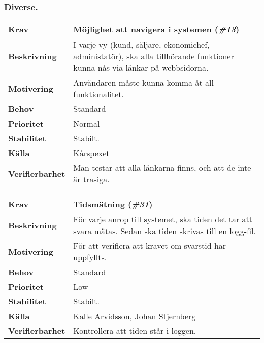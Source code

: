 \documentclass[a4paper, twoside, 11pt, titlepage]{article}
\begin{document}
		\subsubsection{Diverse.}


		\begin{tabular} { p{2.6cm} p{12.5cm} }
			\hline
			\sffamily\textbf{Krav} & Möjlighet att navigera i systemen (\emph{\#13})  \\
			\hline
			\sffamily\textbf{Beskrivning} & I varje vy (kund, säljare, ekonomichef, administatör), ska alla tillhörande funktioner kunna nås via länkar på webbsidorna.  \\
			\hline
			\sffamily\textbf{Motivering} & Användaren måste kunna komma åt all funktionalitet.  \\
			\hline
			\sffamily\textbf{Behov} & Standard  \\
			\hline
			\sffamily\textbf{Prioritet} & Normal  \\
			\hline
			\sffamily\textbf{Stabilitet} & Stabilt.  \\
			\hline
			\sffamily\textbf{Källa} & Kårspexet  \\
			\hline
			\sffamily\textbf{Verifierbarhet} & Man testar att alla länkarna finns, och att de inte är trasiga.  \\
			\hline
		\end{tabular}
		\vspace{6mm}

		\begin{tabular} { p{2.6cm} p{12.5cm} }
			\hline
			\sffamily\textbf{Krav} & Tidsmätning (\emph{\#31})  \\
			\hline
			\sffamily\textbf{Beskrivning} & För varje anrop till systemet, ska tiden det tar att svara mätas. Sedan ska tiden skrivas till en logg-fil.  \\
			\hline
			\sffamily\textbf{Motivering} & För att verifiera att kravet om svarstid har uppfyllts.  \\
			\hline
			\sffamily\textbf{Behov} & Standard  \\
			\hline
			\sffamily\textbf{Prioritet} & Low  \\
			\hline
			\sffamily\textbf{Stabilitet} & Stabilt.  \\
			\hline
			\sffamily\textbf{Källa} & Kalle Arvidsson, Johan Stjernberg  \\
			\hline
			\sffamily\textbf{Verifierbarhet} & Kontrollera att tiden står i loggen.  \\
			\hline
		\end{tabular}
\end{document}
